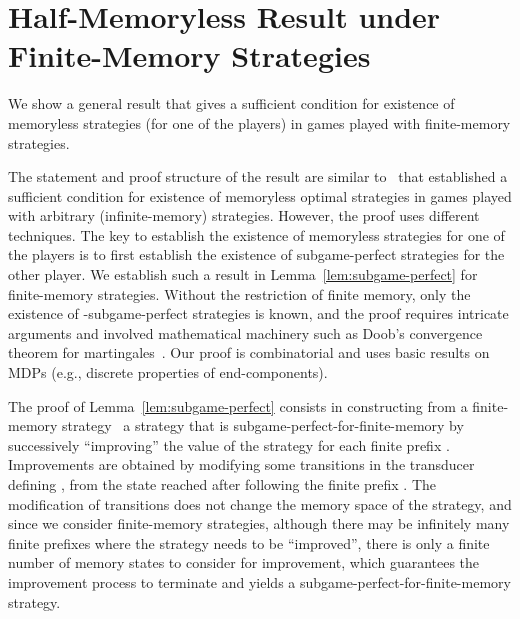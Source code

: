 \documentclass{article}
\begin{document}
\section{Half-Memoryless Result under Finite-Memory Strategies}\label{sec:half}
We show a general result that gives a sufficient condition for existence of memoryless
strategies (for one of the players) in games played with finite-memory strategies.

\smallskip{}
The statement and proof structure of the result are similar to~\cite[Theorem~5.2]{GK14}
that established a sufficient condition for existence of memoryless optimal strategies 
in games played with arbitrary (infinite-memory) strategies. 
However, the proof uses different techniques.  
The key to establish the existence of memoryless strategies for one of the 
players is to first establish the existence of subgame-perfect strategies
for the other player.
We establish such a result in Lemma~\ref{lem:subgame-perfect} for finite-memory
strategies. 
Without the restriction of finite memory, only the existence of -subgame-perfect 
strategies is known, and the proof requires intricate arguments and involved mathematical
machinery such as Doob's convergence theorem for martingales~\cite[Theorem~4.1]{GK14}.
Our proof is combinatorial and uses basic results on MDPs (e.g., discrete properties of 
end-components).

\smallskip{}
The proof of Lemma~\ref{lem:subgame-perfect} consists in constructing from a finite-memory
strategy~ a strategy that is subgame-perfect-for-finite-memory by successively ``improving'' 
the value of the strategy  for each finite prefix . 
Improvements are obtained by modifying some transitions in the transducer defining ,
from the state reached after following the finite prefix . The modification
of transitions does not change the memory space of the strategy, and since we consider 
finite-memory strategies, although there may be infinitely many finite prefixes 
where the strategy needs to be ``improved'', there is only a finite number of memory states
to consider for improvement, which guarantees the improvement process to terminate
and yields a subgame-perfect-for-finite-memory strategy.
\end{document}
